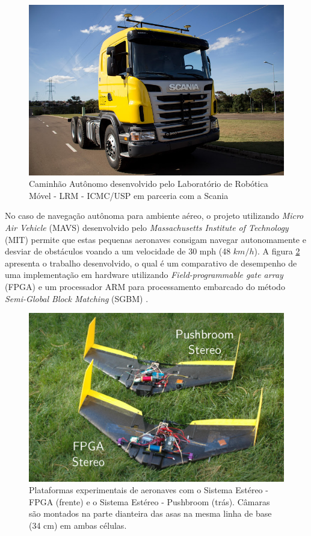 \begin{figure}[H]
 	\centering
 	\includegraphics[scale=0.35]{./Resources/caminhao_autonomo.jpg}
 	\caption{Caminhão Autônomo desenvolvido pelo Laboratório de Robótica Móvel - LRM - ICMC/USP em parceria com a Scania}
 	\label{caminhao_autonomo}
\end{figure}

No caso de navegação autônoma para ambiente aéreo, o projeto utilizando \textit{Micro Air Vehicle} (MAVS) desenvolvido pelo \textit{Massachusetts Institute of Technology} (MIT) permite que estas pequenas aeronaves consigam navegar autonomamente e desviar de obstáculos voando a um velocidade de 30 mph (48 $km/h$). A figura \ref{mit_drones} apresenta o trabalho desenvolvido, o qual é um comparativo de desempenho de uma implementação em hardware utilizando \textit{Field-programmable gate array} (FPGA) e um processador ARM para processamento embarcado do método \textit{Semi-Global Block Matching} (SGBM) \cite{BarryMIT}.

\begin{figure}[H]
 	\centering
 	\includegraphics[scale=0.30]{./Resources/mit_drones.png}
 	\caption{Plataformas experimentais de aeronaves com o Sistema Estéreo - FPGA (frente) e o Sistema Estéreo - Pushbroom (trás). Câmaras são montados na parte dianteira das asas na mesma linha de base (34 cm) em ambas células.}
 	\label{mit_drones}
\end{figure}


